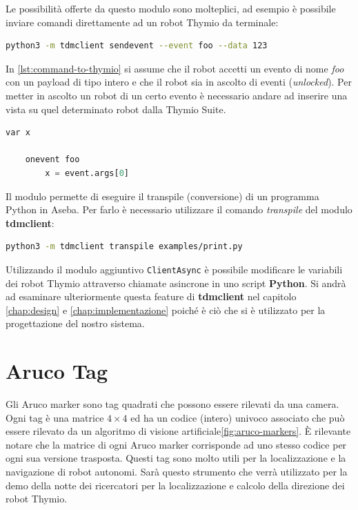 \documentclass[12pt,a4paper,openright,twoside]{book}
\begin{document}
Le possibilità offerte da questo modulo sono molteplici, ad esempio è possibile inviare comandi direttamente ad un robot Thymio da terminale:

\begin{lstlisting}[language=Bash, label={lst:command-to-thymio}, caption={Esempio di invio di comando (foo) ad un robot Thymio}]
    python3 -m tdmclient sendevent --event foo --data 123
\end{lstlisting}

In \cref{lst:command-to-thymio} si assume che il robot accetti un evento di nome \textit{foo} con un payload di tipo intero e che il robot sia in ascolto di eventi (\textit{unlocked}). Per metter in ascolto un robot di un certo evento è necessario andare ad inserire una vista su quel determinato robot dalla Thymio Suite.

\begin{lstlisting}[language=Python, label={lst:thymio-catch-event}, caption={Esempio di programma interno a Thymio per la ricezione di eventi (foo)}]
    var x

    onevent foo
        x = event.args[0]
\end{lstlisting}

Il modulo permette di eseguire il transpile (conversione) di un programma Python in Aseba. Per farlo è necessario utilizzare il comando \textit{transpile} del modulo \textbf{tdmclient}:

\begin{lstlisting}[language=Bash, label={lst:transpile-python-to-aseba}, caption={Esempio di transpile di un programma Python (print.py) in Aseba}]
    python3 -m tdmclient transpile examples/print.py
\end{lstlisting}

Utilizzando il modulo aggiuntivo \verb|ClientAsync| è possibile modificare le variabili dei robot Thymio attraverso chiamate asincrone in uno script \textbf{Python}.
Si andrà ad esaminare ulteriormente questa feature di \textbf{tdmclient} nel capitolo \cref{chap:design} e \cref{chap:implementazione} poiché è ciò che si è utilizzato per la progettazione del nostro sistema.

\section{Aruco Tag}

Gli Aruco marker sono tag quadrati che possono essere rilevati da una camera. Ogni tag è una matrice $4 \times 4$ ed ha un codice (intero) univoco associato che può essere rilevato da un algoritmo di visione artificiale\cref{fig:aruco-markers}. È rilevante notare che la matrice di ogni Aruco marker corrisponde ad uno stesso codice per ogni sua versione trasposta. 
Questi tag sono molto utili per la localizzazione e la navigazione di robot autonomi. Sarà questo strumento che verrà utilizzato per la demo della notte dei ricercatori per la localizzazione e calcolo della direzione dei robot Thymio.
\end{document}
